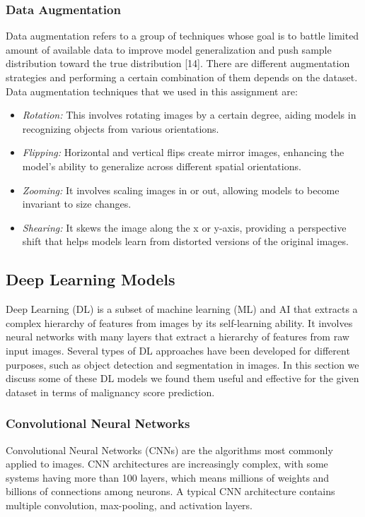 \documentclass[a4paper, twocolumn, 11pt]{article}
\begin{document}
\subsubsection{Data Augmentation}
Data augmentation refers to a group of techniques whose goal is to battle limited amount of available data to improve model generalization and push sample distribution toward the true distribution [14]. There are different augmentation strategies and performing a certain combination of them depends on the dataset. Data augmentation techniques that we used in this assignment are:
\begin{itemize}
    \item \textit{Rotation:} This involves rotating images by a certain degree, aiding models in recognizing objects from various orientations. 
    \item \textit{Flipping:} Horizontal and vertical flips create mirror images, enhancing the model's ability to generalize across different spatial orientations. 
    \item \textit{Zooming:} It involves scaling images in or out, allowing models to become invariant to size changes.
    \item \textit{Shearing:} It skews the image along the x or y-axis, providing a perspective shift that helps models learn from distorted versions of the original images.
\end{itemize}

\subsection{Deep Learning Models}
Deep Learning (DL) is a subset of machine learning (ML) and AI that extracts a complex hierarchy of features from images by its self-learning ability. It involves neural networks with many layers that extract a hierarchy of features from raw input images. Several types of DL approaches have been developed for different purposes, such as object detection and segmentation in images. In this section we discuss some of these DL models we found them useful and effective for the given dataset in terms of malignancy score prediction.
\vspace{7pt}

\subsubsection{Convolutional Neural Networks}
Convolutional Neural Networks (CNNs) are the algorithms most commonly applied to images. CNN architectures are increasingly complex, with some systems having more than 100 layers, which means millions of weights and billions
of connections among neurons. A typical CNN architecture contains multiple convolution, max-pooling, and activation layers. 
\end{document}
